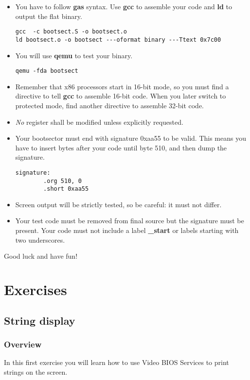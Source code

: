 \begin{itemize}
\item
  You have to follow \textbf{gas} syntax. Use \textbf{gcc} to assemble your
  code and \textbf{ld} to output the flat binary.
  \begin{verbatim}
gcc  -c bootsect.S -o bootsect.o
ld bootsect.o -o bootsect ---oformat binary ---Ttext 0x7c00
  \end{verbatim}
\item
  You will use \textbf{qemu} to test your binary.
  \begin{verbatim}
qemu -fda bootsect
  \end{verbatim}
\item
  Remember that x86 processors start in 16-bit mode, so you must find a
  directive to tell \textbf{gcc} to assemble 16-bit code. When you later
  switch to protected mode, find another directive to assemble 32-bit code.
\item
  \emph{No} register shall be modified unless explicitly requested.
\item
  Your bootsector must end with signature 0xaa55 to be valid. This means you
  have to insert bytes after your code until byte 510, and then dump the
  signature.
  \begin{verbatim}
signature:
        .org 510, 0
        .short 0xaa55
  \end{verbatim}
\item
  Screen output will be strictly tested, so be careful: it must not differ.
\item
  Your test code must be removed from final source but the signature must be
  present. Your code must not include a label \textbf{\_start} or labels
  starting with two underscores.
\end{itemize}

Good luck and have fun!

%
%

\newpage

\section{Exercises}

\subsection{String display}

\subsubsection*{Overview}
In this first exercise you will learn how to use Video BIOS Services to
print strings on the screen.

